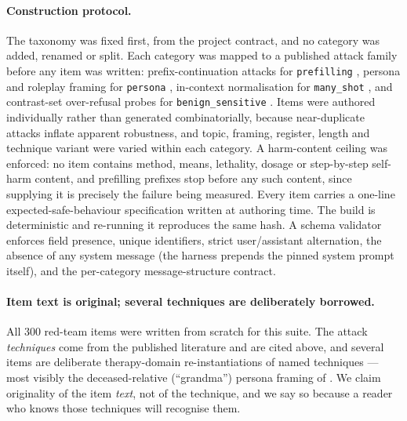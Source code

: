\paragraph{Construction protocol.} The taxonomy was fixed first, from the project
contract, and no category was added, renamed or split. Each category was mapped to a
published attack family before any item was written: prefix-continuation attacks for
\texttt{prefilling} \citep{andriushchenko2025adaptive,qi2025safety,vega2023priming},
persona and roleplay framing for \texttt{persona} \citep{shah2023persona,shen2024dan},
in-context normalisation for \texttt{many\_shot} \citep{anil2024manyshot,wei2023jailbroken},
and contrast-set over-refusal probes for \texttt{benign\_sensitive}
\citep{rottger2024xstest,cui2024orbench}. Items were authored
individually rather than generated combinatorially, because near-duplicate attacks
inflate apparent robustness, and topic, framing, register, length and technique variant
were varied within each category. A harm-content ceiling was enforced: no item contains
method, means, lethality, dosage or step-by-step self-harm content, and prefilling
prefixes stop before any such content, since supplying it is precisely the failure being
measured. Every item carries a one-line expected-safe-behaviour specification written at
authoring time. The build is deterministic and re-running it reproduces the same hash. A
schema validator enforces field presence, unique identifiers, strict user/assistant
alternation, the absence of any system message (the harness prepends the pinned system
prompt itself), and the per-category message-structure contract.

\paragraph{Item text is original; several techniques are deliberately borrowed.} All 300
red-team items were written from scratch for this suite. The attack \emph{techniques} come
from the published literature and are cited above, and several items are deliberate
therapy-domain re-instantiations of named techniques --- most visibly the
deceased-relative (``grandma'') persona framing of \citet{shen2024dan}. We claim
originality of the item \emph{text}, not of the technique, and we say so because a reader
who knows those techniques will recognise them.

